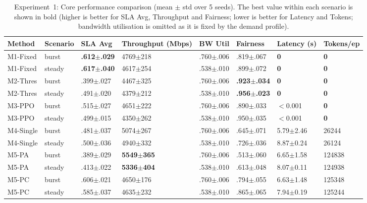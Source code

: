 \begin{table}[h]
  \centering
  \begin{spacing}{1.2}
  \caption{Experiment~1: Core performance comparison (mean $\pm$ std over 5 seeds). The best value within each scenario is shown in bold (higher is better for SLA Avg, Throughput and Fairness; lower is better for Latency and Tokens; bandwidth utilisation is omitted as it is fixed by the demand profile).}\vspace{0.7em}
  \label{table:exp1main}
  \footnotesize
    \begin{tabular}{|p{1.6cm}|p{1.2cm}|p{1.5cm}|p{1.6cm}|p{1.5cm}|p{1.5cm}|p{1.5cm}|p{1.6cm}|}
    \hline
    \textbf{Method} & \textbf{Scenario} & \textbf{SLA Avg} & \textbf{Throughput (Mbps)} & \textbf{BW Util} & \textbf{Fairness} & \textbf{Latency (s)} & \textbf{Tokens/ep} \\
    \hline
    M1-Fixed & burst & \textbf{.612$\pm$.029} & 4769$\pm$218 & .760$\pm$.006 & .819$\pm$.067 & \textbf{0} & \textbf{0} \\
    \hline
    M1-Fixed & steady & \textbf{.617$\pm$.040} & 4617$\pm$254 & .538$\pm$.010 & .899$\pm$.072 & \textbf{0} & \textbf{0} \\
    \hline
    M2-Thres & burst & .399$\pm$.027 & 4467$\pm$325 & .760$\pm$.006 & \textbf{.923$\pm$.034} & \textbf{0} & \textbf{0} \\
    \hline
    M2-Thres & steady & .491$\pm$.020 & 4379$\pm$212 & .538$\pm$.010 & \textbf{.956$\pm$.023} & \textbf{0} & \textbf{0} \\
    \hline
    M3-PPO & burst & .515$\pm$.027 & 4651$\pm$222 & .760$\pm$.006 & .890$\pm$.033 & $<$0.001 & \textbf{0} \\
    \hline
    M3-PPO & steady & .499$\pm$.015 & 4350$\pm$262 & .538$\pm$.010 & .950$\pm$.035 & $<$0.001 & \textbf{0} \\
    \hline
    M4-Single & burst & .481$\pm$.037 & 5074$\pm$267 & .760$\pm$.006 & .645$\pm$.071 & 5.79$\pm$2.46 & 26244 \\
    \hline
    M4-Single & steady & .500$\pm$.036 & 4940$\pm$332 & .538$\pm$.010 & .726$\pm$.036 & 8.87$\pm$0.24 & 26124 \\
    \hline
    M5-PA & burst & .389$\pm$.029 & \textbf{5549$\pm$365} & .760$\pm$.006 & .513$\pm$.060 & 6.65$\pm$1.58 & 124838 \\
    \hline
    M5-PA & steady & .413$\pm$.022 & \textbf{5336$\pm$404} & .538$\pm$.010 & .613$\pm$.048 & 8.07$\pm$0.11 & 124938 \\
    \hline
    M5-PC & burst & .606$\pm$.021 & 4650$\pm$176 & .760$\pm$.006 & .794$\pm$.055 & 6.63$\pm$1.48 & 125348 \\
    \hline
    M5-PC & steady & .585$\pm$.037 & 4635$\pm$232 & .538$\pm$.010 & .865$\pm$.065 & 7.94$\pm$0.19 & 125244 \\
    \hline
    \end{tabular}
  \end{spacing}
\end{table}


